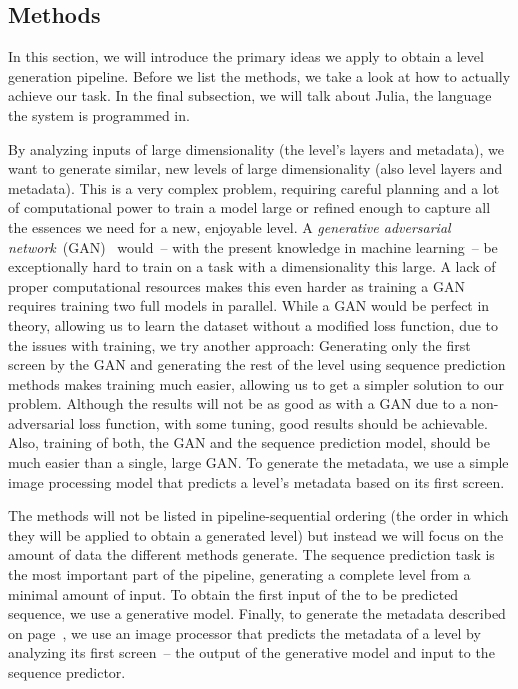 \subsection{Methods}
\label{sec:methods}

In this section, we will introduce the primary ideas we apply to
obtain a level generation pipeline. Before we list the methods, we
take a look at how to actually achieve our task. In the final
subsection, we will talk about Julia, the language the system is
programmed in.

By analyzing inputs of large dimensionality (the level's layers and
metadata), we want to generate similar, new levels of large
dimensionality (also level layers and metadata). This is a very
complex problem, requiring careful planning and a lot of computational
power to train a model large or refined enough to capture all the
essences we need for a new, enjoyable level. A \emph{generative adversarial
network}~(GAN)~\cite{goodfellowGenerativeAdversarialNetworks2014}
would~-- with the present knowledge in machine learning~-- be
exceptionally hard to train on a task with a dimensionality this
large. A lack of proper computational resources makes this even harder
as training a GAN requires training two full models in parallel. While
a GAN would be perfect in theory, allowing us to learn the dataset
without a modified loss function, due to the issues with training, we
try another approach: Generating only the first screen by the GAN and
generating the rest of the level using sequence prediction methods
makes training much easier, allowing us to get a simpler solution to
our problem. Although the results will not be as good as with a GAN
due to a non-adversarial loss function, with some tuning, good results
should be achievable. Also, training of both, the GAN and the sequence
prediction model, should be much easier than a single, large GAN. To
generate the metadata, we use a simple image processing model that
predicts a level's metadata based on its first screen.

The methods will not be listed in pipeline-sequential ordering (the
order in which they will be applied to obtain a generated level) but
instead we will focus on the amount of data the different methods
generate. The sequence prediction task is the most important part of
the pipeline, generating a complete level from a minimal amount of
input. To obtain the first input of the to be predicted sequence, we
use a generative model. Finally, to generate the metadata described on
page~\pageref{par:metadata}, we use an image processor that predicts
the metadata of a level by analyzing its first screen~-- the output of
the generative model and input to the sequence predictor.

